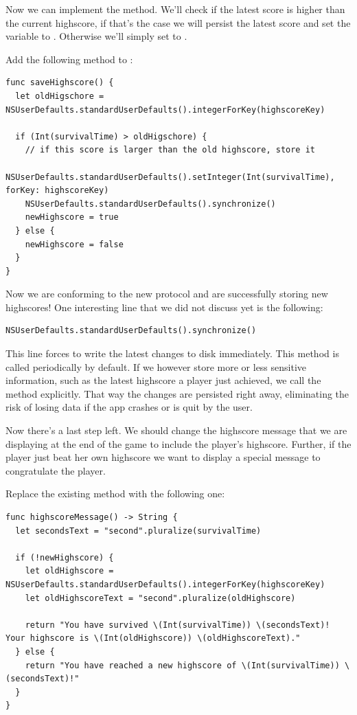 Now we can implement the  method. We'll check if
the latest score is higher than the current highscore, if that's the case we
will persist the latest score and set the  variable to
. Otherwise we'll simply set  to
.

\begin{leftbar}
Add the following method to :
\begin{lstlisting}
func saveHighscore() {
  let oldHigschore = NSUserDefaults.standardUserDefaults().integerForKey(highscoreKey)

  if (Int(survivalTime) > oldHigschore) {
    // if this score is larger than the old highscore, store it
    NSUserDefaults.standardUserDefaults().setInteger(Int(survivalTime), forKey: highscoreKey)
    NSUserDefaults.standardUserDefaults().synchronize()
    newHighscore = true
  } else {
    newHighscore = false
  }
}
\end{lstlisting}
\end{leftbar}

Now we are conforming to the new  protocol and are
successfully storing new highscores! One interesting line that we did not
discuss yet is the following:
\begin{lstlisting}
NSUserDefaults.standardUserDefaults().synchronize()
\end{lstlisting}
This line forces  to write the latest changes to disk
immediately. This method is called periodically by default. If we however store
more or less sensitive information, such as the latest highscore a player just
achieved, we call the method explicitly. That way the changes are persisted
right away, eliminating the risk of losing data if the app crashes or is quit by
the user.

Now there's a last step left. We should change the highscore message that we are
displaying at the end of the game to include the player's highscore. Further, if
the player just beat her own highscore we want to display a special message to
congratulate the player.

\begin{leftbar}
Replace the existing  method with the following
one:
\begin{lstlisting}
func highscoreMessage() -> String {
  let secondsText = "second".pluralize(survivalTime)

  if (!newHighscore) {
    let oldHighscore = NSUserDefaults.standardUserDefaults().integerForKey(highscoreKey)
    let oldHighscoreText = "second".pluralize(oldHighscore)
    
    return "You have survived \(Int(survivalTime)) \(secondsText)! Your highscore is \(Int(oldHighscore)) \(oldHighscoreText)."
  } else {
    return "You have reached a new highscore of \(Int(survivalTime)) \(secondsText)!"
  }
}
\end{lstlisting}
\end{leftbar}

